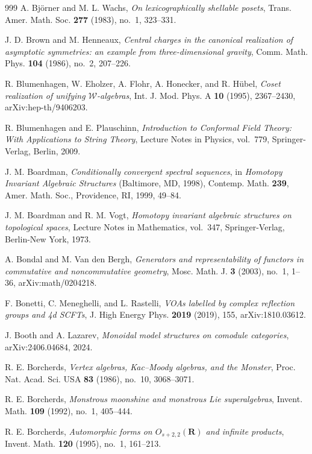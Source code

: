 \begin{thebibliography}{999}
A. Bj\"orner and M. L. Wachs, \emph{On lexicographically shellable posets}, Trans. Amer. Math. Soc. \textbf{277} (1983), no.~1, 323--331.

J. D. Brown and M. Henneaux, \emph{Central charges in the canonical realization of asymptotic symmetries: an example from three-dimensional gravity}, Comm. Math. Phys. \textbf{104} (1986), no.~2, 207--226.

R. Blumenhagen, W. Eholzer, A. Flohr, A. Honecker, and R. H\"ubel, \emph{Coset realization of unifying $\mathcal{W}$-algebras}, Int. J. Mod. Phys. A \textbf{10} (1995), 2367--2430, arXiv:hep-th/9406203.

R. Blumenhagen and E. Plauschinn, \emph{Introduction to Conformal Field Theory: With Applications to String Theory}, Lecture Notes in Physics, vol.~779, Springer-Verlag, Berlin, 2009.

J. M. Boardman, \emph{Conditionally convergent spectral sequences}, in \emph{Homotopy Invariant Algebraic Structures} (Baltimore, MD, 1998), Contemp. Math. \textbf{239}, Amer. Math. Soc., Providence, RI, 1999, 49--84.

J. M. Boardman and R. M. Vogt, \emph{Homotopy invariant algebraic structures on topological spaces}, Lecture Notes in Mathematics, vol.~347, Springer-Verlag, Berlin-New York, 1973.

A. Bondal and M. Van den Bergh, \emph{Generators and representability of functors in commutative and noncommutative geometry}, Mosc. Math. J. \textbf{3} (2003), no.~1, 1--36, arXiv:math/0204218.

F. Bonetti, C. Meneghelli, and L. Rastelli, \emph{VOAs labelled by complex reflection groups and 4d SCFTs}, J. High Energy Phys. \textbf{2019} (2019), 155, arXiv:1810.03612.

J. Booth and A. Lazarev, \emph{Monoidal model structures on comodule categories}, arXiv:2406.04684, 2024.

R. E. Borcherds, \emph{Vertex algebras, Kac--Moody algebras, and the Monster}, Proc. Nat. Acad. Sci. USA \textbf{83} (1986), no.~10, 3068--3071.

R. E. Borcherds, \emph{Monstrous moonshine and monstrous Lie superalgebras}, Invent. Math. \textbf{109} (1992), no.~1, 405--444.

R. E. Borcherds, \emph{Automorphic forms on $O_{s+2,2}(\mathbf{R})$ and infinite products}, Invent. Math. \textbf{120} (1995), no.~1, 161--213.


\end{thebibliography}

